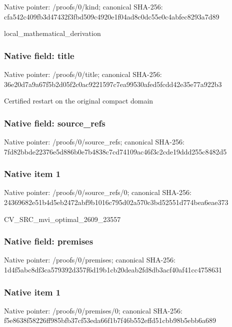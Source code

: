 \documentclass[10pt,a4paper]{article}
\begin{document}
Native pointer: /proofs/0/kind; canonical SHA-256: cfa542c409fb3d47432f3fbd\allowbreak{}509c4920e1f04ad8c0dc55e0\allowbreak{}c4abfec8293a7d89


local\_mathematical\_derivation


\subsubsection{Native field: title}


Native pointer: /proofs/0/title; canonical SHA-256: 36e20d7a9a67f5b2d05f2c0a\allowbreak{}c9221597c7ea99530afed5fc\allowbreak{}dd42e35e77a922b3


Certified restart on the original compact domain


\subsubsection{Native field: source\_refs}


Native pointer: /proofs/0/source\_refs; canonical SHA-256: 7fd82bbde22376e5d886b0e7\allowbreak{}b4838c7cd74109ac46f3c2cd\allowbreak{}e19ddd255c8482d5



\subsubsection{Native item 1}


Native pointer: /proofs/0/source\_refs/0; canonical SHA-256: 24369682e51b4d5eb2472abf\allowbreak{}9b1016c795d02a570c3bd525\allowbreak{}51d774bea6eae373


CV\_SRC\_mvi\_optimal\_2609\_23557


\subsubsection{Native field: premises}


Native pointer: /proofs/0/premises; canonical SHA-256: 1d4f5abc8df3ca579392d357\allowbreak{}f6d19b1cb20deab2fd8db3ac\allowbreak{}f40af41cc4758631



\subsubsection{Native item 1}


Native pointer: /proofs/0/premises/0; canonical SHA-256: f5e8638f58226ff985bfb37c\allowbreak{}f53eda66f1b7f46b552effd5\allowbreak{}1cbb98b5ebb6a689
\end{document}
